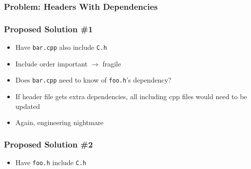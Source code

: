 \documentclass{../ucll-slides}
\begin{document}
\begin{frame}
  \frametitle{Problem: Headers With Dependencies}
  \begin{overprint}
  \end{overprint}
\end{frame}

\begin{frame}
  \frametitle{Proposed Solution \#1}
  \begin{itemize}
    \item Have {\tt bar.cpp} also include {\tt C.h}
    \item Include order important $\rightarrow$ fragile
    \item Does {\tt bar.cpp} need to know of {\tt foo.h}'s dependency?
    \item If header file gets extra dependencies, all including {cpp} files
          would need to be updated
    \item Again, engineering nightmare
  \end{itemize}  
\end{frame}

\begin{frame}
  \frametitle{Proposed Solution \#2}
  \begin{overprint}
  \end{overprint}
  \begin{itemize}
    \item Have {\tt foo.h} include {\tt C.h}
  \end{itemize}
\end{frame}
\end{document}

